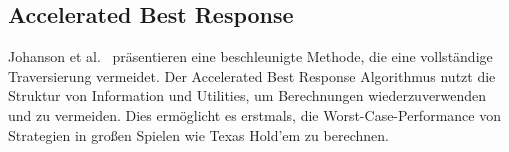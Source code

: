 \subsection{Accelerated Best Response}

Johanson et al.~\cite{johanson2011accelerating} präsentieren eine beschleunigte Methode, die eine vollständige Traversierung vermeidet.
Der Accelerated Best Response Algorithmus nutzt die Struktur von Information und Utilities, um Berechnungen wiederzuverwenden und zu vermeiden.
Dies ermöglicht es erstmals, die Worst-Case-Performance von Strategien in großen Spielen wie Texas Hold'em zu berechnen.
